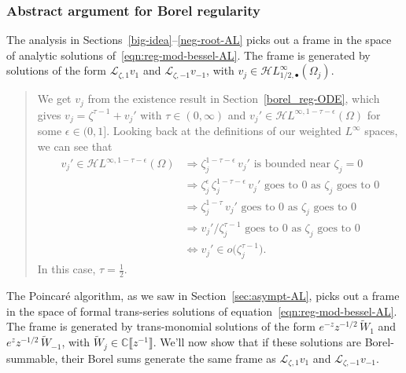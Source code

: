 \documentclass{article}
\newcommand{\singexp}[2]{\mathcal{H}L^\infty_{#1, #2}}
\newcommand{\singexpalg}[1]{\singexp{#1}{\bullet}}
\theoremstyle{definition}
\newcommand{\C}{\mathbb{C}}
\newcommand{\holoL}[1]{\mathcal{H}L^{#1}} %
\newcommand{\laplace}{\mathcal{L}}
\theoremstyle{plain}
\begin{document}
\subsubsection{Abstract argument for Borel regularity}\label{bessel-regularity-AL}
The analysis in Sections~\ref{big-idea}--\ref{neg-root-AL} picks out a frame in the space of analytic solutions of~\eqref{eqn:reg-mod-bessel-AL}. The frame is generated by solutions of the form $\laplace_{\zeta, 1} v_1$ and $\laplace_{\zeta, -1} v_{-1}$, with $v_j\in\singexpalg{1/2}(\Omega_j)$.
\color{DarkTurquoise}
\begin{quote}
We get $v_j$ from the existence result in Section~\ref{borel_reg-ODE}, which gives $v_j = \zeta^{\tau-1} + v_j'$ with $\tau \in (0, \infty)$ and $v_j' \in \holoL{\infty, 1-\tau-\epsilon}(\Omega)$ for some $\epsilon \in (0, 1]$. Looking back at the definitions of our weighted $L^\infty$ spaces, we can see that
\begin{align*}
v_j' \in \holoL{\infty, 1-\tau-\epsilon}(\Omega) & \Longrightarrow \zeta_j^{1-\tau-\epsilon}\,v_j' \text{ is bounded near } \zeta_j = 0 \\
& \Longrightarrow \zeta_j^\epsilon\,\zeta_j^{1-\tau-\epsilon}\,v_j' \text{ goes to } 0 \text{ as } \zeta_j \text{ goes to } 0 \\
& \Longrightarrow \zeta_j^{1-\tau}\,v_j' \text{ goes to } 0 \text{ as } \zeta_j \text{ goes to } 0 \\
& \Longrightarrow v_j' / \zeta_j^{\tau-1} \text{ goes to } 0 \text{ as } \zeta_j \text{ goes to } 0 \\
& \Longleftrightarrow v_j' \in o\big(\zeta_j^{\tau-1}\big).
\end{align*}
In this case, $\tau = \tfrac{1}{2}$.
\end{quote}
\color{black}

The Poincar\'{e} algorithm, as we saw in Section~\ref{sec:asympt-AL}, picks out a frame in the space of formal trans-series solutions of equation~\eqref{eqn:reg-mod-bessel-AL}. The frame is generated by trans-monomial solutions of the form $e^{-z} z^{-1/2}\,\tilde{W}_1$ and $e^z z^{-1/2}\,\tilde{W}_{-1}$, with $\tilde{W}_j \in \C\llbracket z^{-1} \rrbracket$. We'll now show that if these solutions are Borel-summable, their Borel sums generate the same frame as $\laplace_{\zeta, 1} v_1$ and $\laplace_{\zeta, -1} v_{-1}$.
\end{document}
